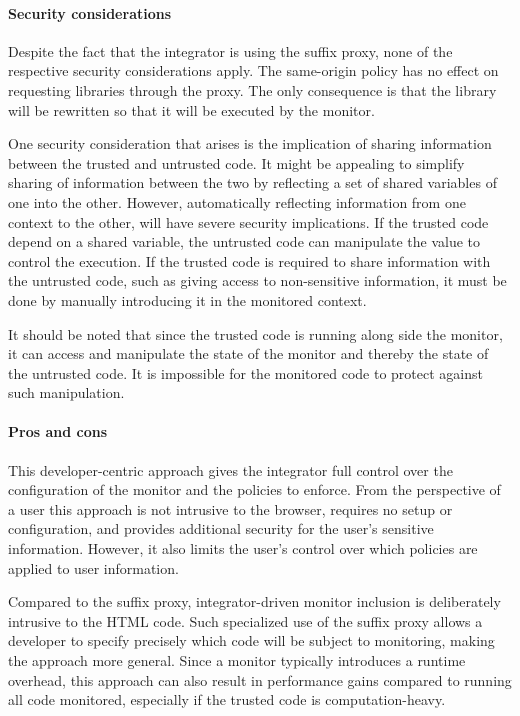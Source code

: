 \documentclass{llncs}
\begin{document}
\paragraph{Security considerations}

Despite the fact that the integrator is using the suffix proxy, none of the 
respective security considerations apply. The same-origin policy has no effect 
on requesting libraries through the proxy. The only consequence is that the library
will be rewritten so that it will be executed by the monitor.

One security consideration that arises is the implication of sharing information between the 
trusted and untrusted code. It might be appealing to simplify sharing of 
information between the two by reflecting a set of shared variables of one into the other.
However, automatically 
reflecting information from one context to the other, will 
have severe security implications. If the trusted code depend on a 
shared variable, the untrusted code can manipulate the value to control the
execution.
If the trusted code is required to share information 
with the untrusted code, such as giving access to non-sensitive information, it 
must be done by manually introducing it in the monitored context.

It should be noted that since the trusted code is running along side the monitor, 
it can access and manipulate the state of the monitor and thereby the state of 
the untrusted code. It is impossible for the monitored code to protect against 
such manipulation.

\paragraph{Pros and cons}

This developer-centric approach gives the integrator full control over the 
configuration of the monitor and the policies to enforce. From the perspective of a user this 
approach is not intrusive to the browser, requires no setup or configuration, 
and provides additional security for the user's sensitive information. However, 
it also limits the user's control over which policies are applied to user information. 

Compared to the suffix proxy, integrator-driven monitor 
inclusion is deliberately intrusive to the HTML code. Such specialized use of the suffix 
proxy allows a developer to specify precisely which code will be subject to 
monitoring, making the approach more general. 
Since a monitor typically introduces a runtime overhead, this approach can also 
result in performance gains compared to running all code monitored, especially 
if the trusted code is computation-heavy.
\end{document}
